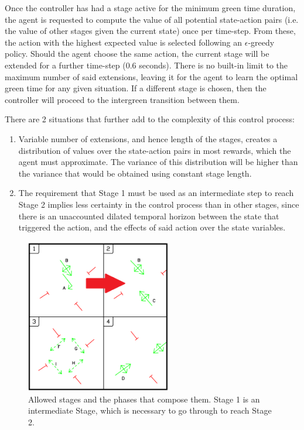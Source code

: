 \documentclass[conference]{IEEEtran}
\begin{document}
Once the controller has had a stage active for the minimum green time duration, the agent is requested to compute the value of all potential state-action pairs (i.e. the value of other stages given the current state) once per time-step.
From these, the action with the highest expected value is selected following an $\epsilon$-greedy policy\cite{suttonbarto}.
Should the agent choose the same action, the current stage will be extended for a further time-step (0.6 seconds).
There is no built-in limit to the maximum number of said extensions, leaving it for the agent to learn the optimal green time for any given situation.
If a different stage is chosen, then the controller will proceed to the intergreen transition between them.

There are 2 situations that further add to the complexity of this control process:
\begin{enumerate}
\item Variable number of extensions, and hence length of the stages, creates a distribution of values over the state-action pairs in most rewards, which the agent must approximate. The variance of this distribution will be higher than the variance that would be obtained using constant stage length.
\item The requirement that Stage 1 must be used as an intermediate step to reach Stage 2 implies less certainty in the control process than in other stages, since there is an unaccounted dilated temporal horizon between the state that triggered the action, and the effects of said action over the state variables.
\end{enumerate}

\begin{figure}                                                
\centering                                                    
\includegraphics[width=2.5in]{phases_limited.png}                                    
\caption{Allowed stages and the phases that compose them. Stage 1 is an intermediate Stage, which is necessary to go through to reach Stage 2.}                                  
\label{intersection}                                               
\end{figure}     
\end{document}
